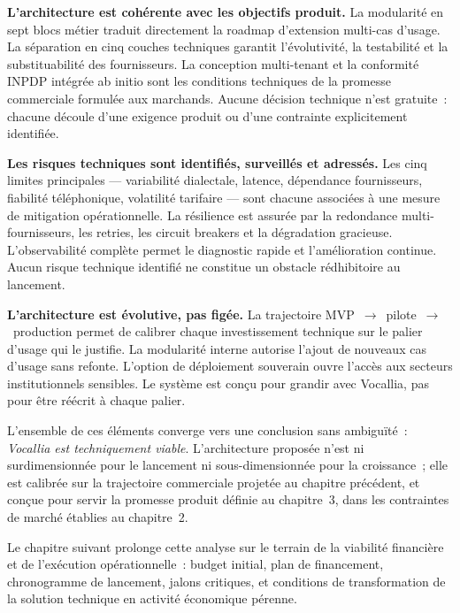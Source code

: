 \textbf{L'architecture est cohérente avec les objectifs produit.} La modularité en sept blocs métier traduit directement la roadmap d'extension multi-cas d'usage. La séparation en cinq couches techniques garantit l'évolutivité, la testabilité et la substituabilité des fournisseurs. La conception multi-tenant et la conformité INPDP intégrée ab initio sont les conditions techniques de la promesse commerciale formulée aux marchands. Aucune décision technique n'est gratuite~: chacune découle d'une exigence produit ou d'une contrainte explicitement identifiée.

\textbf{Les risques techniques sont identifiés, surveillés et adressés.} Les cinq limites principales — variabilité dialectale, latence, dépendance fournisseurs, fiabilité téléphonique, volatilité tarifaire — sont chacune associées à une mesure de mitigation opérationnelle. La résilience est assurée par la redondance multi-fournisseurs, les retries, les circuit breakers et la dégradation gracieuse. L'observabilité complète permet le diagnostic rapide et l'amélioration continue. Aucun risque technique identifié ne constitue un obstacle rédhibitoire au lancement.

\textbf{L'architecture est évolutive, pas figée.} La trajectoire MVP~$\to$~pilote~$\to$~production permet de calibrer chaque investissement technique sur le palier d'usage qui le justifie. La modularité interne autorise l'ajout de nouveaux cas d'usage sans refonte. L'option de déploiement souverain ouvre l'accès aux secteurs institutionnels sensibles. Le système est conçu pour grandir avec Vocallia, pas pour être réécrit à chaque palier.

L'ensemble de ces éléments converge vers une conclusion sans ambiguïté~: \emph{Vocallia est techniquement viable}. L'architecture proposée n'est ni surdimensionnée pour le lancement ni sous-dimensionnée pour la croissance~; elle est calibrée sur la trajectoire commerciale projetée au chapitre précédent, et conçue pour servir la promesse produit définie au chapitre~3, dans les contraintes de marché établies au chapitre~2.

Le chapitre suivant prolonge cette analyse sur le terrain de la viabilité financière et de l'exécution opérationnelle~: budget initial, plan de financement, chronogramme de lancement, jalons critiques, et conditions de transformation de la solution technique en activité économique pérenne.